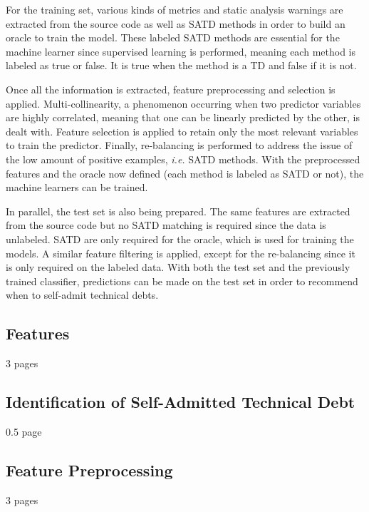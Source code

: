 For the training set, various kinds of metrics and static analysis warnings are extracted from the source code as well as \ac{SATD} methods in order to build an oracle to train the model. These labeled \ac{SATD} methods are essential for the machine learner since supervised learning is performed, meaning each method is labeled as true or false. It is true when the method is a \ac{TD} and false if it is not. \par 

Once all the information is extracted, feature preprocessing and selection is applied. Multi-collinearity, a phenomenon occurring when two predictor variables are highly correlated, meaning that one can be linearly predicted by the other, is dealt with. Feature selection is applied to retain only the most relevant variables to train the predictor. Finally, re-balancing is performed to address the issue of the low amount of positive examples, \textit{i.e.} \ac{SATD} methods. With the preprocessed features and the oracle now defined (each method is labeled as \ac{SATD} or not), the machine learners can be trained. \par 

In parallel, the test set is also being prepared. The same features are extracted from the source code but no \ac{SATD} matching is required since the data is unlabeled. \ac{SATD} are only required for the oracle, which is used for training the models. A similar feature filtering is applied, except for the re-balancing since it is only required on the labeled data. With both the test set and the previously trained classifier, predictions can be made on the test set in order to recommend when to self-admit technical debts.

\subsection{Features}

3 pages

\subsection{Identification of Self-Admitted Technical Debt}

0.5 page

\subsection{Feature Preprocessing}

3 pages

